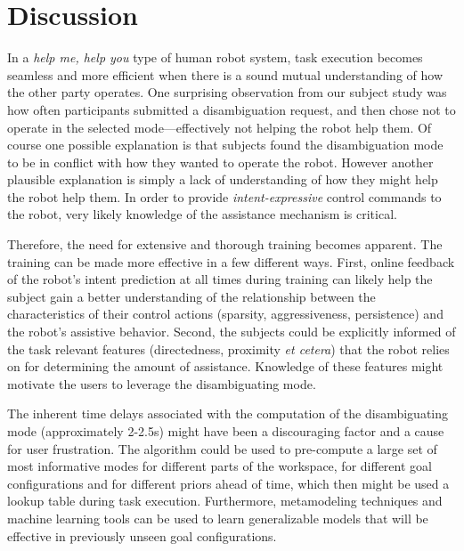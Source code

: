\documentclass[natbib, twocolumn]{svjour3}          %
\begin{document}
%
\section{Discussion}\label{sec:discussions}
 
 
 In a \textit{help me, help you} type of human robot system, task execution becomes seamless and more efficient when there is a sound mutual understanding of how the other party operates. One surprising observation from our subject study was how often participants submitted a disambiguation request, and then chose not to operate in the selected mode---effectively not helping the robot help them. Of course one possible explanation is that subjects found the disambiguation mode to be in conflict with how they wanted to operate the robot. However another plausible explanation is simply a lack of understanding of how they might help the robot help them. In order to provide \textit{intent-expressive} control commands to the robot, very likely knowledge of the assistance mechanism is critical. 
 
 Therefore, the need for extensive and thorough training becomes apparent.
 The training can be made more effective in a few different ways. First, online feedback of the robot's intent prediction at all times during training can likely help the subject gain a better understanding of the relationship between the characteristics of their control actions (sparsity, aggressiveness, persistence) and the robot's assistive behavior. Second, the subjects could be explicitly informed of the task relevant features (directedness, proximity \textit{et cetera}) that the robot relies on for determining the amount of assistance. Knowledge of these features might motivate the users to leverage the disambiguating mode. 
 
 The inherent time delays associated with the computation of the disambiguating mode (approximately 2-2.5s) might have been a discouraging factor and a cause for user frustration. The algorithm could be used to pre-compute a large set of most informative modes for different parts of the workspace, for different goal configurations and for different priors ahead of time, which then might be used a lookup table during task execution. Furthermore, metamodeling techniques and machine learning tools can be used to learn generalizable models that will be effective in previously unseen goal configurations. 
 
\end{document}
